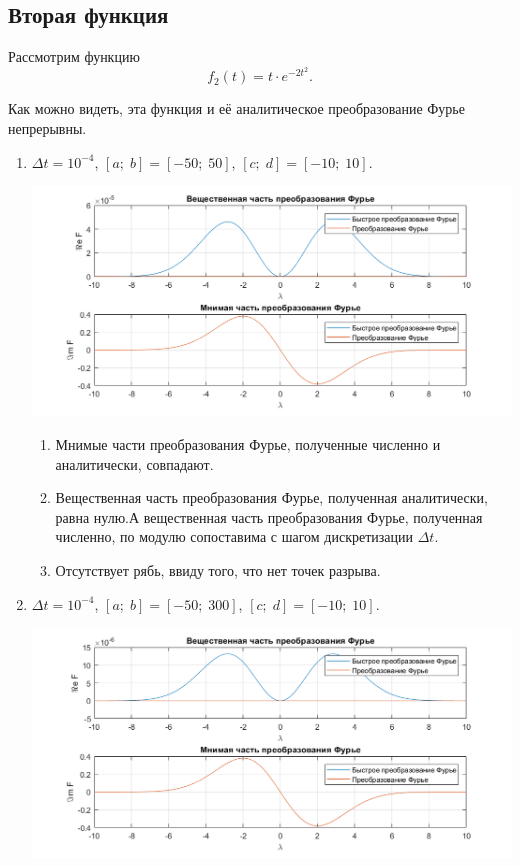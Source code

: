 \documentclass[a4paper, 11pt]{article}
\begin{document}
    \subsection{Вторая функция}
        Рассмотрим функцию
        $$
            f_2(t) = t \cdot e^{-2t^2}.        
        $$  
        
        Как можно видеть, эта функция и её аналитическое преобразование Фурье непрерывны.
        \begin{enumerate}
            \item
                $\Delta t = 10^{-4}$, $[a;\; b] = [-50;\; 50]$, $[c;\;d] = [-10;\;10]$.
                
                \includegraphics[width=\linewidth]{img/4.png}
                
                \begin{enumerate}
                    \item
                        Мнимые части преобразования Фурье, полученные численно и аналитически, совпадают. 
                    \item
                        Вещественная часть преобразования Фурье, полученная аналитически, равна нулю.А вещественная часть преобразования Фурье, полученная численно, по модулю сопоставима с шагом дискретизации $\Delta t$.
                    \item
                        Отсутствует рябь, ввиду того, что нет точек разрыва.
                \end{enumerate}
            
            \item
                $\Delta t = 10^{-4}$, $[a;\; b] = [-50;\; 300]$, $[c;\;d] = [-10;\;10]$.
                
                \includegraphics[width=\linewidth]{img/5.png}
                

\end{enumerate}
\end{document}
